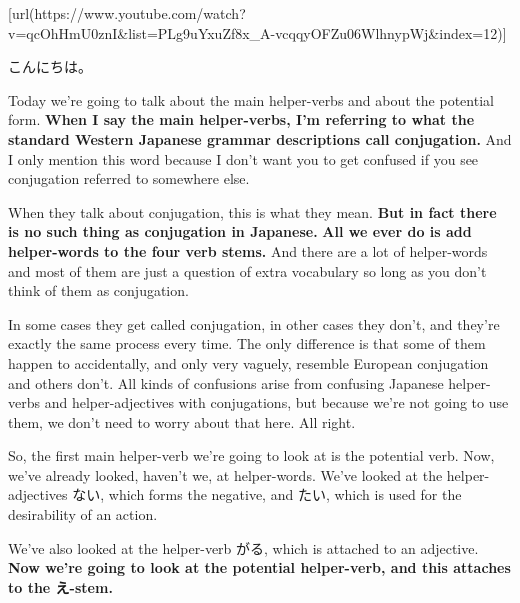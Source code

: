 \startsectionlevel[title={{\bf 10. Helper verbs & the potential helper verb}},reference={helper-verbs-the-potential-helper-verb}]

[url(https://www.youtube.com/watch?v=qcOhHmU0znI&list=PLg9uYxuZf8x_A-vcqqyOFZu06WlhnypWj&index=12)]

こんにちは。

Today we're going to talk about the main helper-verbs and about the potential form. {\bf When I say the main helper-verbs, I'm referring to what the standard Western Japanese grammar descriptions call conjugation.} And I only mention this word because I don't want you to get confused if you see conjugation referred to somewhere else.

When they talk about conjugation, this is what they mean. {\bf But in fact there is no such thing as conjugation in Japanese.} {\bf All we ever do is add helper-words to the four verb stems.} And there are a lot of helper-words and most of them are just a question of extra vocabulary so long as you don't think of them as conjugation.

{}

In some cases they get called conjugation, in other cases they don't, and they're exactly the same process every time. The only difference is that some of them happen to accidentally, and only very vaguely, resemble European conjugation and others don't. All kinds of confusions arise from confusing Japanese helper-verbs and helper-adjectives with conjugations, but because we're not going to use them, we don't need to worry about that here. All right.

\startsectionlevel[title={The potential helper verb},reference={the-potential-helper-verb}]

So, the first main helper-verb we're going to look at is the potential verb. Now, we've already looked, haven't we, at helper-words. We've looked at the helper-adjectives ない, which forms the negative, and たい, which is used for the desirability of an action.

{}

We've also looked at the helper-verb がる, which is attached to an adjective. {\bf Now we're going to look at the potential helper-verb, and this attaches to the え-stem.}

{}

